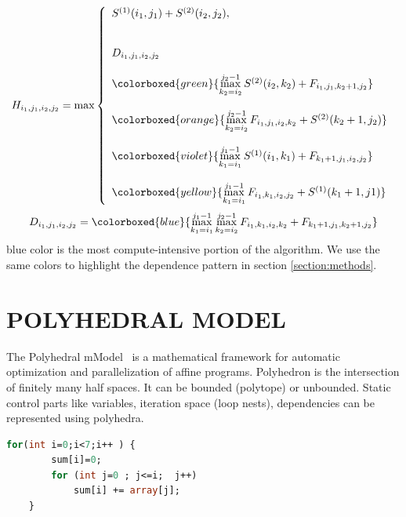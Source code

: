 \begin{equation}
\label{eqn:bpm_recurrence_h}
H_{i_{1},j_{1},i_{2},j_{2}} \\ = \max \left \{\begin{array}{lr}
                 S^{(1)}(i_{1}, j_{1})  + S^{(2)}(i_{2}, j_{2}), \\
                 \\
                \\D_{i_{1},j_{1},i_{2},j_{2}}\\
                 \\
                 \colorboxed{green}{\max\limits_{k_{2}=i_{2}}^{j_{2}-1} S^{(2)}(i_{2}, k_{2}) + F_{i_{1},j_{1}, k_{2}+1, j_{2}}}\\
                 \\
                 \colorboxed{orange}{{\max\limits_{k_{2}=i_{2}}^{j_{2}-1} F_{i_{1},j_{1}, i_{2}, k_{2}} + S^{(2)}(k_{2}+1, j_{2})}}\\
                 \\
                 \colorboxed{violet}{\max\limits_{k_{1}=i_{1}}^{j_{1}-1}  S^{(1)}(i_{1}, k_{1}) + F_{k_{1}+1,j_{1},i_{2}, j_{2}}}\\
                 \\
                 \colorboxed{yellow}{\max\limits_{k_{1}=i_{1}}^{j_{1}-1} F_{i_{1},k_{1}, i_{2}, j_{2}}+ S^{(1)}(k_{1}+1, j{1})} \\
               \end{array}
           \right. \\
\end{equation}
\begin{equation}
\label{eqn:bpm_recurrence_h_dmaxp1}
D_{i_{1},j_{1},i_{2},j_{2}} \\ = 
                 \colorboxed{blue}{\max\limits_{k_{1}=i_{1}}^{j_{1}-1} \max\limits_{k_{2}=i_{2}}^{j_{2}-1} F_{i_{1},k_{1}, i_{2}, k_{2}}+ F_{k_{1}+1,j_{1}, k_{2}+1, j_{2}}}\\
\end{equation}
    blue color is the most compute-intensive portion of the algorithm. We use the same colors to highlight the dependence pattern in section \ref{section:methods}.

\section{\uppercase{Polyhedral Model}}
The Polyhedral mModel~\cite{sanjay-fst-tcs, quinton-jvsp89, feautrier91, feautrier92a, feautrier92b} is a mathematical framework for automatic optimization and parallelization of affine programs. Polyhedron is the intersection of finitely many half spaces. It can be bounded (polytope) or unbounded. Static control parts like variables, iteration space (loop nests), dependencies can be represented using polyhedra. 
\begin{lstlisting}[label={listing:scan}, language=Caml, caption={Prefix sum}]
    for(int i=0;i<7;i++ ) {
        sum[i]=0;
        for (int j=0 ; j<=i;  j++) 
            sum[i] += array[j]; 
    }
\end{lstlisting}


